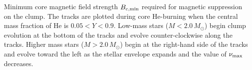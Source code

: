 \label{fig:BcClump}
Minimum core magnetic field strength $B_{c,{\rm min}}$ required for magnetic suppression on the clump. The tracks are plotted during core He-burning when the central mass fraction of He is $0.05 < Y < 0.9$. Low-mass stars ($M<2.0 \, M_\odot$) begin clump evolution at the bottom of the tracks and evolve counter-clockwise along the tracks. Higher mass stars ($M>2.0 \, M_\odot$) begin at the right-hand side of the tracks and evolve toward the left as the stellar envelope expands and the value of $\nu_{\rm max}$ decreases.
  